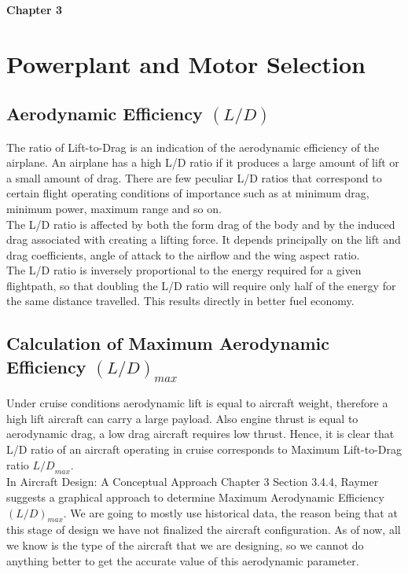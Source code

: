 \documentclass[12 pt]{article}
\begin{document}
\vfill

\afterpage{\clearpage}

\newpage

\textbf{\Huge{Chapter 3}}

\section{Powerplant and Motor Selection}

\subsection{{Aerodynamic Efficiency ${(L/D)}$}}
The ratio of Lift-to-Drag is an indication of the aerodynamic efficiency of the airplane. An airplane has a high L/D ratio if it produces a large amount of lift or a small amount of drag. There are few peculiar L/D ratios that correspond to certain flight operating conditions of importance such as at minimum drag, minimum power, maximum range and so on.\\

The L/D ratio is affected by both the form drag of the body and by the induced drag associated with creating a lifting force. It depends principally on the lift and drag coefficients, angle of attack to the airflow and the wing aspect ratio.\\

The L/D ratio is inversely proportional to the energy required for a given flightpath, so that doubling the L/D ratio will require only half of the energy for the same distance travelled. This results directly in better fuel economy.

\subsection{{Calculation of Maximum Aerodynamic Efficiency ${(L/D)}_{max}$}}
Under cruise conditions aerodynamic lift is equal to aircraft weight, therefore a high lift aircraft can carry a large payload. Also engine thrust is equal to aerodynamic drag, a low drag aircraft requires low thrust. Hence, it is clear that L/D ratio of an aircraft operating in cruise corresponds to Maximum Lift-to-Drag ratio ${L/D}_{max}$.\\

In Aircraft Design: A Conceptual Approach Chapter 3 Section 3.4.4, Raymer suggests a graphical approach to determine Maximum Aerodynamic Efficiency ${(L/D)}_{max}$. We are going to mostly use historical data, the reason being that at this stage of design we have not finalized the aircraft configuration. As of now, all we know is the type of the aircraft that we are designing, so we cannot do anything better to get the accurate value of this aerodynamic parameter.\\
\end{document}
